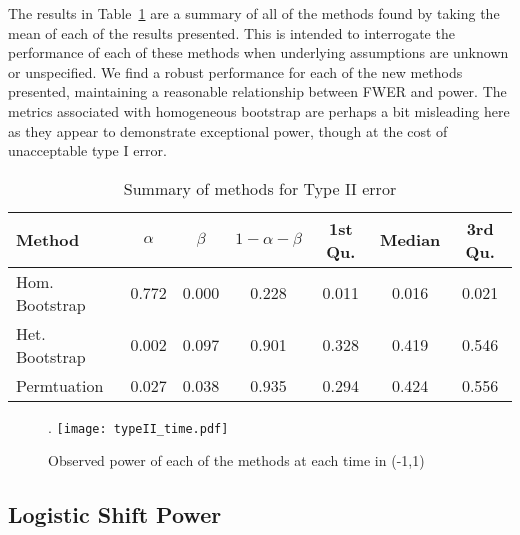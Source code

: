 The results in Table~\ref{tab:type_2_summary} are a summary of all of the methods found by taking the mean of each of the results presented. This is intended to interrogate the performance of each of these methods when underlying assumptions are unknown or unspecified. We find a robust performance for each of the new methods presented, maintaining a reasonable relationship between FWER and power. The metrics associated with homogeneous bootstrap are perhaps a bit misleading here as they appear to demonstrate exceptional power, though at the cost of unacceptable type I error.

\begin{table}[H]
\centering
\begin{tabular}{lcccccc}
  \hline
Method & $\alpha$ & $\beta$ & $1 - \alpha - \beta$ & 1st Qu. & Median & 3rd Qu. \\ 
  \hline
Hom. Bootstrap & 0.772 & 0.000 & 0.228 & 0.011 & 0.016 & 0.021 \\ 
  Het. Bootstrap & 0.002 & 0.097 & 0.901 & 0.328 & 0.419 & 0.546 \\ 
  Permtuation & 0.027 & 0.038 & 0.935 & 0.294 & 0.424 & 0.556 \\ 
   \hline
\end{tabular}
\caption{Summary of methods for Type II error} 
\label{tab:type_2_summary}
\end{table}




\begin{figure}[H]
\centering.
\texttt{[image: typeII\_time.pdf]}
\caption{Observed power of each of the methods at each time in (-1,1)}
\label{fig:time_power_plot}
\end{figure}


\subsection{Logistic Shift Power}

